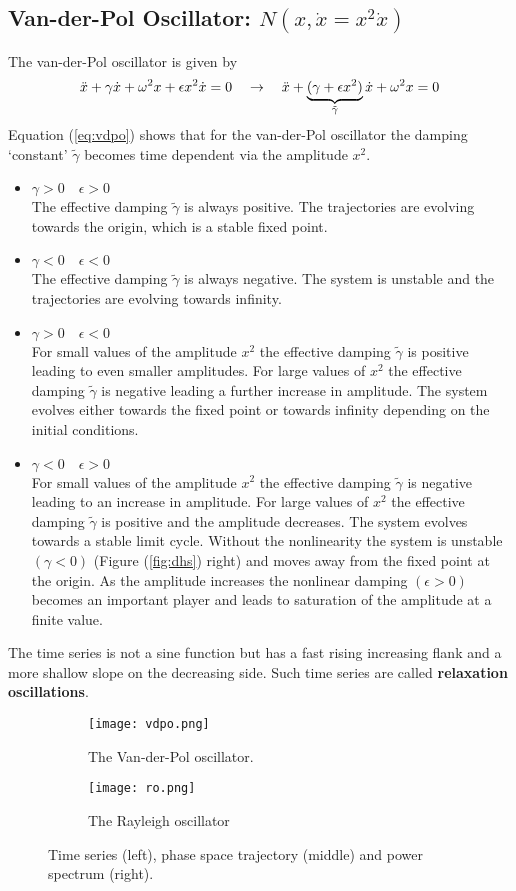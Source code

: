 \subsection{Van-der-Pol Oscillator: $N(x,\dot{x}=x^2\dot{x})$}
The van-der-Pol oscillator is given by
\begin{equation}{\label{eq:vdpo}}
	\ddot{x}+\gamma\dot{x}+\omega^2x+\epsilon x^2\dot{x}=0\quad\rightarrow\quad
	\ddot{x}+\underbrace{(\gamma+\epsilon x^2)}_{\tilde{\gamma}}\dot{x}+\omega^2x=0
\end{equation}
Equation (\ref{eq:vdpo}) shows that for the van-der-Pol oscillator the damping ‘constant’ $\tilde{\gamma}$ becomes time dependent via the amplitude $x^2$.
\begin{itemize}
	\item $\gamma>0\quad\epsilon>0$\\ The effective damping $\tilde{\gamma}$ is always positive.
	The trajectories are evolving towards the origin, which is a stable fixed point.
	\item $\gamma<0\quad\epsilon<0$\\ The effective damping $\tilde{\gamma}$ is always negative.
	The system is unstable and the trajectories are evolving towards infinity.
	\item $\gamma>0\quad\epsilon<0$\\ For small values of the amplitude $x^2$ the effective damping $\tilde{\gamma}$ is positive leading to even smaller amplitudes.
	For large values of $x^2$ the effective damping $\tilde{\gamma}$ is negative leading a further increase in amplitude.
	The system evolves either towards the fixed point or towards infinity depending on the initial conditions.
	\item $\gamma<0\quad\epsilon>0$\\ For small values of the amplitude $x^2$ the effective damping $\tilde{\gamma}$ is negative leading to an increase in amplitude.
	For large values of $x^2$ the effective damping $\tilde{\gamma}$ is positive and the amplitude decreases.
	The system evolves towards a stable limit cycle.
	Without the nonlinearity the system is unstable $(\gamma<0)$ (Figure (\ref{fig:dhs}) right) and moves away from the fixed point at the origin.
	As the amplitude increases the nonlinear damping $(\epsilon>0)$ becomes an important player and leads to saturation of the amplitude at a finite value.
\end{itemize}
The time series is not a sine function but has a fast rising increasing flank and a more shallow slope on the decreasing side. Such time series are called \textbf{relaxation oscillations}.
\begin{figure}[h!]
	\centering
	\begin{subfigure}{0.45\linewidth}
		\centering
		\texttt{[image: vdpo.png]}
		\caption{The Van-der-Pol oscillator.}
		\label{fig:vdpo}
	\end{subfigure}
	\vline
	\begin{subfigure}{0.45\linewidth}
		\centering
		\texttt{[image: ro.png]}
		\caption{The Rayleigh oscillator}
		\label{fig:ro}
	\end{subfigure}
	\caption{Time series (left), phase space trajectory (middle) and power spectrum (right).}
\end{figure}
